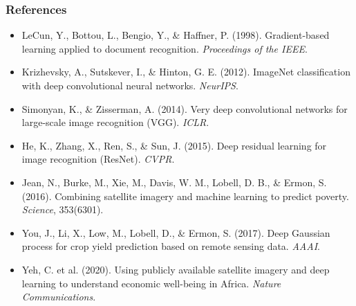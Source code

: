 \documentclass[notes,11pt, aspectratio=169]{beamer}
\begin{document}
\begin{frame}
\frametitle{References}

\footnotesize
\begin{itemize}
    \item LeCun, Y., Bottou, L., Bengio, Y., \& Haffner, P. (1998). Gradient-based learning applied to document recognition. \textit{Proceedings of the IEEE}.
    \item Krizhevsky, A., Sutskever, I., \& Hinton, G. E. (2012). ImageNet classification with deep convolutional neural networks. \textit{NeurIPS}.
    \item Simonyan, K., \& Zisserman, A. (2014). Very deep convolutional networks for large-scale image recognition (VGG). \textit{ICLR}.
    \item He, K., Zhang, X., Ren, S., \& Sun, J. (2015). Deep residual learning for image recognition (ResNet). \textit{CVPR}.
    \item Jean, N., Burke, M., Xie, M., Davis, W. M., Lobell, D. B., \& Ermon, S. (2016). Combining satellite imagery and machine learning to predict poverty. \textit{Science}, 353(6301).
    \item You, J., Li, X., Low, M., Lobell, D., \& Ermon, S. (2017). Deep Gaussian process for crop yield prediction based on remote sensing data. \textit{AAAI}.
    \item Yeh, C. et al. (2020). Using publicly available satellite imagery and deep learning to understand economic well-being in Africa. \textit{Nature Communications}.
\end{itemize}
\end{frame}
\end{document}

